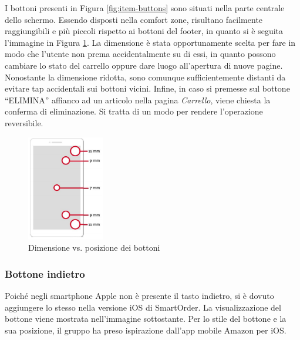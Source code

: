 \documentclass[12pt, a4paper, titlepage]{report}
\begin{document}
	\noindent I bottoni presenti in Figura \ref{fig:item-buttons} sono situati nella parte centrale dello schermo. Essendo disposti nella comfort zone, risultano facilmente raggiungibili e più piccoli rispetto ai bottoni del footer, in quanto si è seguita l'immagine in Figura \ref{fig:dimvspos}. La dimensione è stata opportunamente scelta per fare in modo che l'utente non prema accidentalmente su di essi, in quanto possono cambiare lo stato del carrello oppure dare luogo all'apertura di nuove pagine. Nonostante la dimensione ridotta, sono comunque sufficientemente distanti da evitare tap accidentali sui bottoni vicini. Infine, in caso si premesse sul bottone ``ELIMINA'' affianco ad un articolo nella pagina \textit{Carrello}, viene chiesta la conferma di eliminazione. Si tratta di un modo per rendere l'operazione reversibile.
	\begin{figure}[H] 
		\centering
		\includegraphics[width=0.3\textwidth]{img/dimvspos}
		\caption{Dimensione vs. posizione dei bottoni}
		\label{fig:dimvspos}
	\end{figure}

	\subsubsection{Bottone indietro}
	
	Poiché negli smartphone Apple non è presente il tasto indietro, si è dovuto aggiungere lo stesso nella versione iOS di SmartOrder. La visualizzazione del bottone viene mostrata nell'immagine sottostante. Per lo stile del bottone e la sua posizione, il gruppo ha preso ispirazione dall'app mobile Amazon per iOS.
	
\end{document}
